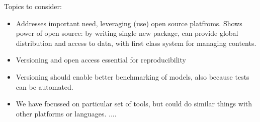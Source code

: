 \documentclass[a4paper,11pt]{article}
\begin{document}
Topics to consider:

\begin{itemize}

\item Addresses important need, leveraging (use) open source platfroms. Shows power of open source: by writing single new package, can provide global distribution and access to data, with first class system for managing contents.
\item Versioning and open access essential for reproducibility
\item Versioning should enable better benchmarking of models, also because tests can be automated.
\item We have focussed on particular set of tools, but could do similar things with other platforms or languages.
....
\end{itemize}



%
%
%
%
%
%
%
%
\end{document}
